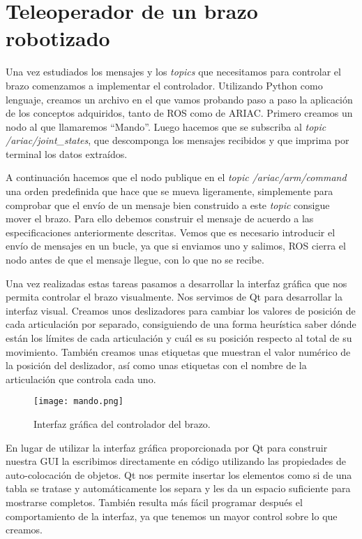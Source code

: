 \section{Teleoperador de un brazo robotizado}
\label{sec:br_teleoperador}

Una vez estudiados los mensajes y los \textit{topics} que necesitamos para controlar el brazo comenzamos a implementar el controlador. Utilizando Python como lenguaje, creamos un archivo en el que vamos probando paso a paso la aplicación de los conceptos adquiridos, tanto de ROS como de ARIAC. 
Primero creamos un nodo al que llamaremos “Mando”. Luego hacemos que se subscriba al \textit{topic} \textit{/ariac/joint\_states}, que descomponga los mensajes recibidos y que imprima por terminal los datos extraídos. 

A continuación hacemos que el nodo publique en el \textit{topic /ariac/arm/command} una orden predefinida que hace que se mueva ligeramente, simplemente para comprobar que el envío de un mensaje bien construido a este \textit{topic} consigue mover el brazo. Para ello debemos construir el mensaje de acuerdo a las especificaciones anteriormente descritas. Vemos que es necesario introducir el envío de mensajes en un bucle, ya que si enviamos uno y salimos, ROS cierra el nodo antes de que el mensaje llegue, con lo que no se recibe.

Una vez realizadas estas tareas pasamos a desarrollar la interfaz gráfica que nos permita controlar el brazo visualmente. Nos servimos de Qt para desarrollar la interfaz visual. Creamos unos deslizadores para cambiar los valores de posición de cada articulación por separado, consiguiendo de una forma heurística saber dónde están los límites de cada articulación y cuál es su posición respecto al total de su movimiento. También creamos unas etiquetas que muestran el valor numérico de la posición del deslizador, así como unas etiquetas con el nombre de la articulación que controla cada uno. 

\begin{figure}[]
	\centering\texttt{[image: mando.png]}
	\caption{Interfaz gráfica del controlador del brazo.}
	\label{fig:mando}
\end{figure}

En lugar de utilizar la interfaz gráfica proporcionada por Qt para construir nuestra GUI la escribimos directamente en código utilizando las propiedades de auto-colocación de objetos. Qt nos permite insertar los elementos como si de una tabla se tratase y automáticamente los separa y les da un espacio suficiente para mostrarse completos. También resulta más fácil programar después el comportamiento de la interfaz, ya que tenemos un mayor control sobre lo que creamos. 

